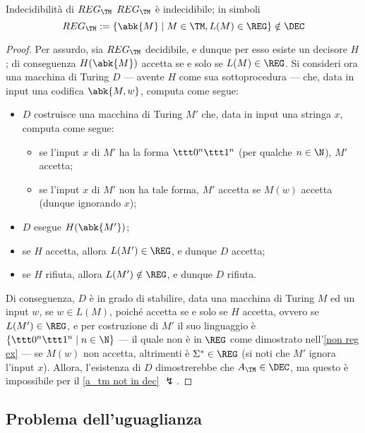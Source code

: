 \documentclass[a4paper, 12pt]{report}
\begin{document}
    \begin{framedthm}{Indecidibilità di $REG_\TM$}
        $REG_\TM$ è indecidibile; in simboli $$REG_\TM := \{\abk{M} \mid M \in \TM , L(M) \in \REG\} \notin \DEC$$
    \end{framedthm}

    \begin{proof}
        Per assurdo, sia $REG_\TM$ decidibile, e dunque per esso esiste un decisore $H$; di conseguenza $H(\abk{M})$ accetta se e solo se $L(M) \in \REG$. Si consideri ora una macchina di Turing $D$ --- avente $H$ come sua sottoprocedura --- che, data in input una codifica $\abk{M, w}$, computa come segue:

        \begin{itemize}
            \item $D$ costruisce una macchina di Turing $M'$ che, data in input una stringa $x$, computa come segue:
                \begin{itemize}
                    \item se l'input $x$ di $M'$ ha la forma $\ttt 0^n \ttt 1 ^n$ (per qualche $n \in \N$), $M'$ accetta;
                    \item se l'input $x$ di $M'$ non ha tale forma, $M'$ accetta se $M(w)$ accetta (dunque ignorando $x$);
                \end{itemize}
            \item $D$ esegue $H(\abk{M'})$;
            \item se $H$ accetta, allora $L(M') \in \REG$, e dunque $D$ accetta;
            \item se $H$ rifiuta, allora $L(M') \notin \REG$, e dunque $D$ rifiuta.
        \end{itemize}

        Di conseguenza, $D$ è in grado di stabilire, data una macchina di Turing $M$ ed un input $w$, se $w \in L(M)$, poiché accetta se e solo se $H$ accetta, ovvero se $L(M') \in \REG$, e per costruzione di $M'$ il suo linguaggio è $\{\ttt 0^n \ttt 1^n \mid n \in \N\}$ --- il quale non è in $\REG$ come dimostrato nell'\cref{non reg ex} --- se $M(w)$ non accetta, altrimenti è $\Sigma^* \in \REG$ (si noti che $M'$ ignora l'input $x$). Allora, l'esistenza di $D$ dimostrerebbe che $A_\TM \in \DEC$, ma questo è impossibile per il \cref{a_tm not in dec} $\lightning$.
    \end{proof}

    \subsection{Problema dell'uguaglianza}
\end{document}
